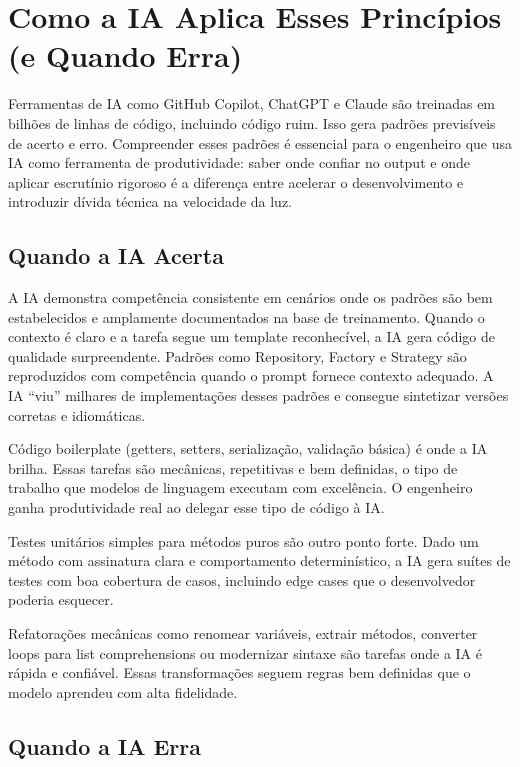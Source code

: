 \section{Como a IA Aplica Esses Princípios (e Quando Erra)}

Ferramentas de IA como GitHub Copilot, ChatGPT e Claude são treinadas em bilhões
de linhas de código, incluindo código ruim. Isso gera padrões previsíveis de
acerto e erro. Compreender esses padrões é essencial para o engenheiro que usa
IA como ferramenta de produtividade: saber onde confiar no output e onde aplicar
escrutínio rigoroso é a diferença entre acelerar o desenvolvimento e introduzir
dívida técnica na velocidade da luz.

\subsection{Quando a IA Acerta}

A IA demonstra competência consistente em cenários onde os padrões são bem
estabelecidos e amplamente documentados na base de treinamento. Quando o
contexto é claro e a tarefa segue um template reconhecível, a IA gera código
de qualidade surpreendente. Padrões como Repository, Factory e Strategy são
reproduzidos com competência quando o prompt fornece contexto adequado. A IA
``viu'' milhares de implementações desses padrões e consegue sintetizar versões
corretas e idiomáticas.

Código boilerplate (getters, setters, serialização, validação básica)
é onde a IA brilha. Essas tarefas são mecânicas, repetitivas e
bem definidas, o tipo de trabalho que modelos de linguagem
executam com excelência. O engenheiro ganha produtividade real ao delegar
esse tipo de código à IA.

Testes unitários simples para métodos puros são outro ponto forte. Dado um
método com assinatura clara e comportamento determinístico, a IA gera
suítes de testes com boa cobertura de casos, incluindo edge cases que o
desenvolvedor poderia esquecer.

Refatorações mecânicas como renomear variáveis, extrair métodos, converter
loops para list comprehensions ou modernizar sintaxe são tarefas onde
a IA é rápida e confiável. Essas transformações seguem regras bem
definidas que o modelo aprendeu com alta fidelidade.

\subsection{Quando a IA Erra}

